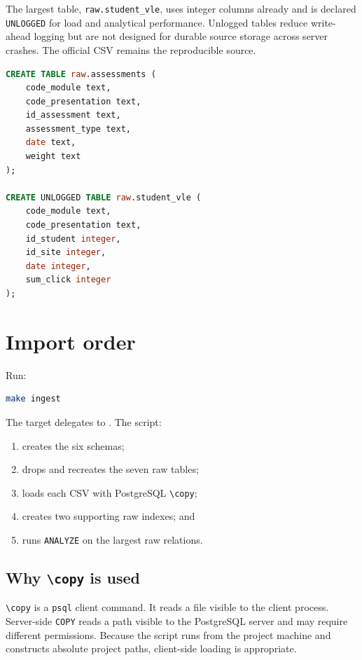 The largest table, \texttt{raw.student\_vle}, uses integer columns already and
is declared \texttt{UNLOGGED} for load and analytical performance. Unlogged
tables reduce write-ahead logging but are not designed for durable source
storage across server crashes. The official CSV remains the reproducible
source.

\begin{lstlisting}[language=SQL,caption={Selected raw landing definitions from
\texttt{sql/01\_raw\_tables.sql}.}]
CREATE TABLE raw.assessments (
    code_module text,
    code_presentation text,
    id_assessment text,
    assessment_type text,
    date text,
    weight text
);

CREATE UNLOGGED TABLE raw.student_vle (
    code_module text,
    code_presentation text,
    id_student integer,
    id_site integer,
    date integer,
    sum_click integer
);
\end{lstlisting}

\section{Import order}

Run:

\begin{lstlisting}[language=bash]
make ingest
\end{lstlisting}

The target delegates to . The script:
\begin{enumerate}
  \item creates the six schemas;
  \item drops and recreates the seven raw tables;
  \item loads each CSV with PostgreSQL \texttt{\textbackslash copy};
  \item creates two supporting raw indexes; and
  \item runs \texttt{ANALYZE} on the largest raw relations.
\end{enumerate}

\subsection{Why \texttt{\textbackslash copy} is used}

\texttt{\textbackslash copy} is a \texttt{psql} client command. It reads a file
visible to the client process. Server-side \texttt{COPY} reads a path visible
to the PostgreSQL server and may require different permissions. Because the
script runs from the project machine and constructs absolute project paths,
client-side loading is appropriate.

